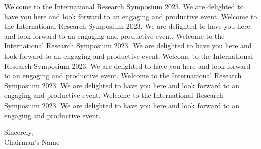 	
	Welcome to the International Research Symposium 2023. We are delighted to have you here and look forward to an engaging and productive event. Welcome to the International Research Symposium 2023. We are delighted to have you here and look forward to an engaging and productive event. Welcome to the International Research Symposium 2023. We are delighted to have you here and look forward to an engaging and productive event. Welcome to the International Research Symposium 2023. We are delighted to have you here and look forward to an engaging and productive event. Welcome to the International Research Symposium 2023. We are delighted to have you here and look forward to an engaging and productive event. Welcome to the International Research Symposium 2023. We are delighted to have you here and look forward to an engaging and productive event. 
	
	\vspace{1cm}
	\noindent
	Sincerely,\\
	Chairman's Name
	
	\newpage
	